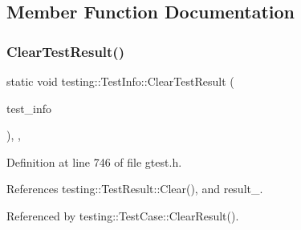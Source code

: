 \subsection{Member Function Documentation}
\mbox{\label{classtesting_1_1TestInfo_ac6d80865a3e68478aaf167058e6ca5c2}} 
\subsubsection{\texorpdfstring{Clear\+Test\+Result()}{ClearTestResult()}}
{\footnotesize\ttfamily static void testing\+::\+Test\+Info\+::\+Clear\+Test\+Result (\begin{DoxyParamCaption}\item[{\hyperlink{classtesting_1_1TestInfo}{Test\+Info} $\ast$}]{test\+\_\+info }\end{DoxyParamCaption})\hspace{0.3cm}{\ttfamily [inline]}, {\ttfamily [static]}, {\ttfamily [private]}}



Definition at line 746 of file gtest.\+h.



References testing\+::\+Test\+Result\+::\+Clear(), and result\+\_\+.



Referenced by testing\+::\+Test\+Case\+::\+Clear\+Result().


